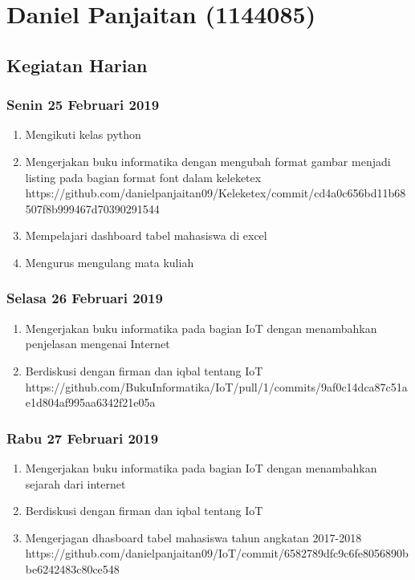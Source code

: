 \chapter{Daniel Panjaitan (1144085)}

\section{Kegiatan Harian}
\subsection{Senin 25 Februari 2019}
\begin{enumerate}
  \item Mengikuti kelas python
  \item Mengerjakan buku informatika dengan mengubah format gambar menjadi listing pada bagian format font dalam keleketex
  \subitem https://github.com/danielpanjaitan09/Keleketex/commit/cd4a0c656bd11b68507f8b999467d70390291544
  \item Mempelajari dashboard tabel mahasiswa di excel
  \item Mengurus mengulang mata kuliah
\end{enumerate}


\subsection{Selasa 26 Februari 2019}
\begin{enumerate}
  \item Mengerjakan buku informatika pada bagian IoT dengan menambahkan penjelasan mengenai Internet
  \item Berdiskusi dengan firman dan iqbal tentang IoT
  \subitem https://github.com/BukuInformatika/IoT/pull/1/commits/9af0c14dca87c51ae1d804af995aa6342f21e05a
\end{enumerate}

\subsection{Rabu 27 Februari 2019}
\begin{enumerate}
  \item Mengerjakan buku informatika pada bagian IoT dengan menambahkan sejarah dari internet
  \item Berdiskusi dengan firman dan iqbal tentang IoT
  \item Mengerjagan dhasboard tabel mahasiswa tahun angkatan 2017-2018
  \subitem https://github.com/danielpanjaitan09/IoT/commit/6582789dfc9c6fe8056890bbe6242483c80ce548
\end{enumerate}

